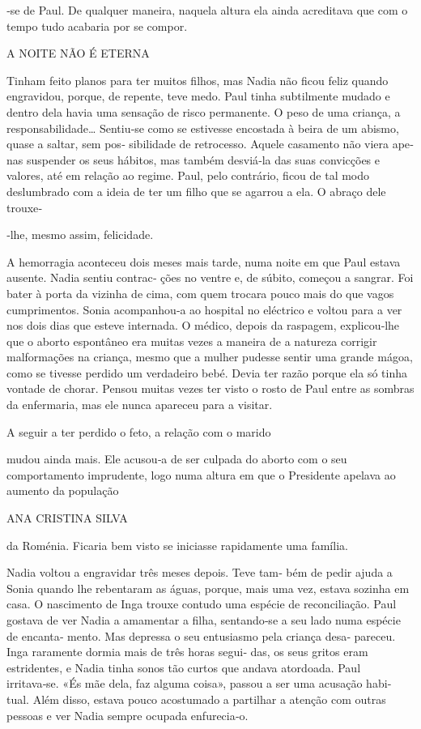 ‑se de Paul. De qualquer maneira, naquela altura ela ainda acreditava
que com o tempo tudo acabaria por se compor.

A NOITE NÃO É ETERNA

Tinham feito planos para ter muitos filhos, mas Nadia não ficou feliz
quando engravidou, porque, de repente, teve medo. Paul tinha subtilmente
mudado e dentro dela havia uma sensação de risco permanente. O peso de
uma criança, a responsabilidade\ldots{} Sentiu‑se como se estivesse
encostada à beira de um abismo, quase a saltar, sem pos‑ sibilidade de
retrocesso. Aquele casamento não viera ape‑ nas suspender os seus
hábitos, mas também desviá‑la das suas convicções e valores, até em
relação ao regime. Paul, pelo contrário, ficou de tal modo deslumbrado
com a ideia de ter um filho que se agarrou a ela. O abraço dele trouxe‑

‑lhe, mesmo assim, felicidade.

A hemorragia aconteceu dois meses mais tarde, numa noite em que Paul
estava ausente. Nadia sentiu contrac‑ ções no ventre e, de súbito,
começou a sangrar. Foi bater à porta da vizinha de cima, com quem
trocara pouco mais do que vagos cumprimentos. Sonia acompanhou‑a ao
hospital no eléctrico e voltou para a ver nos dois dias que esteve
internada. O médico, depois da raspagem, explicou‑lhe que o aborto
espontâneo era muitas vezes a maneira de a natureza corrigir
malformações na criança, mesmo que a mulher pudesse sentir uma grande
mágoa, como se tivesse perdido um verdadeiro bebé. Devia ter razão
porque ela só tinha vontade de chorar. Pensou muitas vezes ter visto o
rosto de Paul entre as sombras da enfermaria, mas ele nunca apareceu
para a visitar.

A seguir a ter perdido o feto, a relação com o marido

mudou ainda mais. Ele acusou‑a de ser culpada do aborto com o seu
comportamento imprudente, logo numa altura em que o Presidente apelava
ao aumento da população

ANA CRISTINA SILVA

da Roménia. Ficaria bem visto se iniciasse rapidamente uma família.

Nadia voltou a engravidar três meses depois. Teve tam‑ bém de pedir
ajuda a Sonia quando lhe rebentaram as águas, porque, mais uma vez,
estava sozinha em casa. O nascimento de Inga trouxe contudo uma espécie
de reconciliação. Paul gostava de ver Nadia a amamentar a filha,
sentando‑se a seu lado numa espécie de encanta‑ mento. Mas depressa o
seu entusiasmo pela criança desa‑ pareceu. Inga raramente dormia mais de
três horas segui‑ das, os seus gritos eram estridentes, e Nadia tinha
sonos tão curtos que andava atordoada. Paul irritava‑se. «És mãe dela,
faz alguma coisa», passou a ser uma acusação habi‑ tual. Além disso,
estava pouco acostumado a partilhar a atenção com outras pessoas e ver
Nadia sempre ocupada enfurecia‑o.

